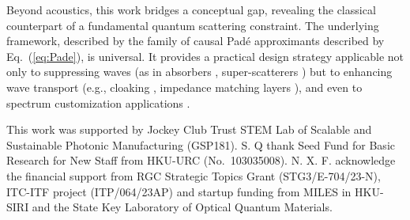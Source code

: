 \documentclass[final,5p,times,twocolumn]{elsarticle}
\begin{document}
Beyond acoustics, this work bridges a conceptual gap, revealing the classical counterpart of a fundamental quantum scattering constraint. The underlying framework, described by the family of causal Padé approximants described by Eq.~(\ref{eq:Pade}), is universal. It provides a practical design strategy applicable not only to suppressing waves (as in absorbers \cite{qu2024analytical,qu2025duality,yang2025acoustic}, super-scatterers \cite{ramachandran2023bandwidth}) but to enhancing wave transport (e.g., cloaking \cite{monticone2013cloaked}, impedance matching layers \cite{dong2025soft,dong2020bioinspired}), and even to spectrum customization applications \cite{wang2023meta,qu2023reverberation}.

This work was supported by Jockey Club Trust STEM Lab of Scalable and Sustainable Photonic Manufacturing (GSP181). S. Q thank Seed Fund for Basic Research for New Staff from HKU-URC (No.~103035008). N. X. F. acknowledge the financial support from RGC Strategic Topics Grant (STG3/E-704/23-N), ITC-ITF project (ITP/064/23AP) and startup funding from MILES in HKU-SIRI and the State Key Laboratory of Optical Quantum Materials.

\newpage
\end{document}
